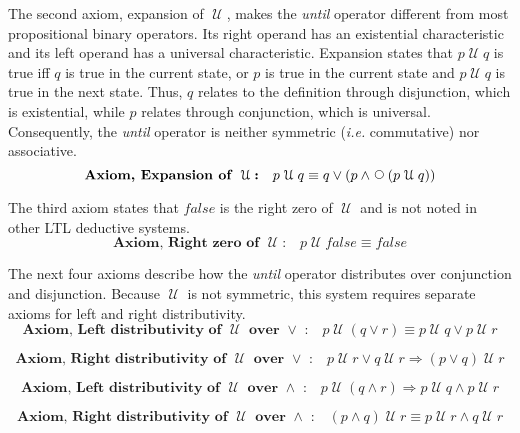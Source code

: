 \documentclass[12pt, fleqn, leqno]{article}
\newcommand{\impl}{\ensuremath{\Rightarrow}}        %
\newcommand{\Until}{\;\mathcal{U}\;}
\newcommand{\Next}{\;\,\text{\raisebox{3.5pt}{\circle{6}}}}
\newcommand{\firstspacer}{\vspace{-26pt}}
\begin{document}
The second axiom, expansion of $\Until$, makes the \textit{until} operator different from most propositional binary operators.
Its right operand has an existential characteristic and its left operand has a universal characteristic.
Expansion  states that
$p\Until q$ is true iff $q$ is true in the current state, or $p$ is true in the current state and $p\Until q$ is
true in the next state.
Thus, $q$ relates to the definition through disjunction, which is existential,
while $p$ relates through conjunction, which is universal.
Consequently, the \textit{until} operator is neither symmetric (\textit{i.e.} commutative) nor associative.
\begin{equation}\label{E:expansionUntil}
\textbf{Axiom, Expansion of $\Until$:}\quad p \Until q \equiv q \lor (p \land \Next (p \Until q))
\end{equation}

The third axiom states that $false$ is the right zero of $\Until$ and is not noted in other LTL deductive systems.
\begin{equation}\label{E:untilFalse}
\textbf{Axiom, Right zero of $\Until$:}\quad p \Until false \equiv false
\end{equation}

The next four axioms describe how the \textit{until} operator distributes over conjunction and disjunction.
Because $\Until$ is not symmetric, this system requires separate axioms for left and right distributivity.
\begin{equation}\label{E:untilOrEquiv}
\textbf{Axiom, Left distributivity of $\Until$ over $\lor$ :}\quad p \Until (q \lor r) \equiv p \Until q \lor p \Until r
\end{equation}

\firstspacer

\begin{equation}\label{E:untilOrImp}
\textbf{Axiom, Right distributivity of $\Until$ over $\lor$ :}\quad p \Until r \lor q \Until r \impl (p \lor q) \Until r
\end{equation}

\firstspacer

\begin{equation}\label{E:untilAndImp}
\textbf{Axiom, Left distributivity of $\Until$ over $\land$ :}\quad p \Until (q \land r) \impl p \Until q \land p \Until r
\end{equation}

\firstspacer

\begin{equation}\label{E:untilAndEquiv}
\textbf{Axiom, Right distributivity of $\Until$ over $\land$ :}\quad (p \land q) \Until r \equiv p \Until r \land q \Until r
\end{equation}
\end{document}
